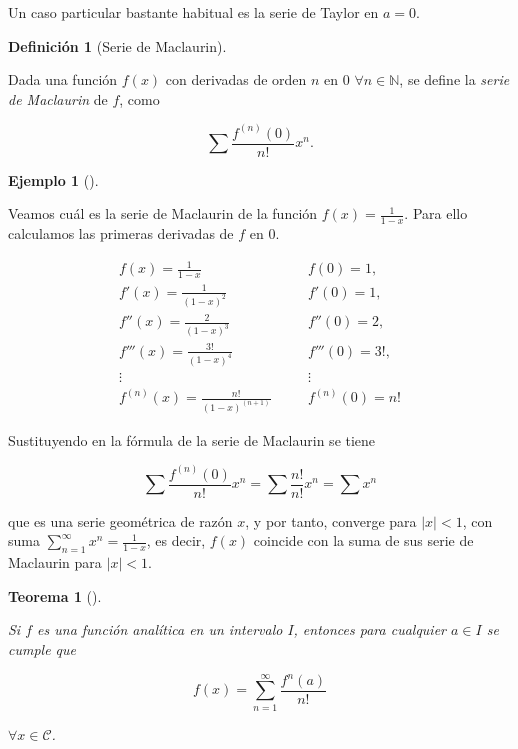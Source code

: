\documentclass[
  a4paper,
]{scrreport}
\theoremstyle{plain}
\theoremstyle{plain}
\newtheorem{theorem}{Teorema}[chapter]
\theoremstyle{definition}
\newtheorem{definition}{Definición}[chapter]
\theoremstyle{plain}
\theoremstyle{definition}
\newtheorem{example}{Ejemplo}[chapter]
\theoremstyle{remark}
\begin{document}
Un caso particular bastante habitual es la serie de Taylor en \(a=0\).

\leavevmode{}%
\begin{definition}[Serie de Maclaurin]\label{def-serie-maclaurin}

Dada una función \(f(x)\) con derivadas de orden \(n\) en \(0\)
\(\forall n\in\mathbb{N}\), se define la \emph{serie de Maclaurin} de
\(f\), como

\[
\sum \frac{f^{(n)}(0)}{n!}x^n.
\]

\end{definition}

\leavevmode{}%
\begin{example}[]\label{exm-serie-taylor}

Veamos cuál es la serie de Maclaurin de la función
\(f(x)=\frac{1}{1-x}\). Para ello calculamos las primeras derivadas de
\(f\) en \(0\).

\[
\begin{array}{lll}
f(x)=\frac{1}{1-x} & \quad & f(0)= 1,\\
f'(x)=\frac{1}{(1-x)^2} & & f'(0)=1,\\
f''(x)=\frac{2}{(1-x)^3} & & f''(0)=2,\\
f'''(x)=\frac{3!}{(1-x)^4} & & f'''(0)=3!,\\
\vdots & & \vdots\\
f^{(n)}(x) = \frac{n!}{(1-x)^(n+1)} & & f^{(n)}(0) = n!
\end{array}
\]

Sustituyendo en la fórmula de la serie de Maclaurin se tiene

\[
\sum \frac{f^{(n)}(0)}{n!}x^n = \sum \frac{n!}{n!}x^n = \sum x^n
\]

que es una serie geométrica de razón \(x\), y por tanto, converge para
\(|x|<1\), con suma \(\sum_{n=1}^\infty x^n =\frac{1}{1-x}\), es decir,
\(f(x)\) coincide con la suma de sus serie de Maclaurin para \(|x|<1\).

\end{example}

\leavevmode{}%
\begin{theorem}[]\label{thm-serie-taylor}

Si \(f\) es una función analítica en un intervalo \(I\), entonces para
cualquier \(a\in I\) se cumple que

\[
f(x)=\sum_{n=1}^\infty \frac{f^{n}(a)}{n!}
\]

\(\forall x\in\mathcal{C}\).

\end{theorem}
\end{document}
